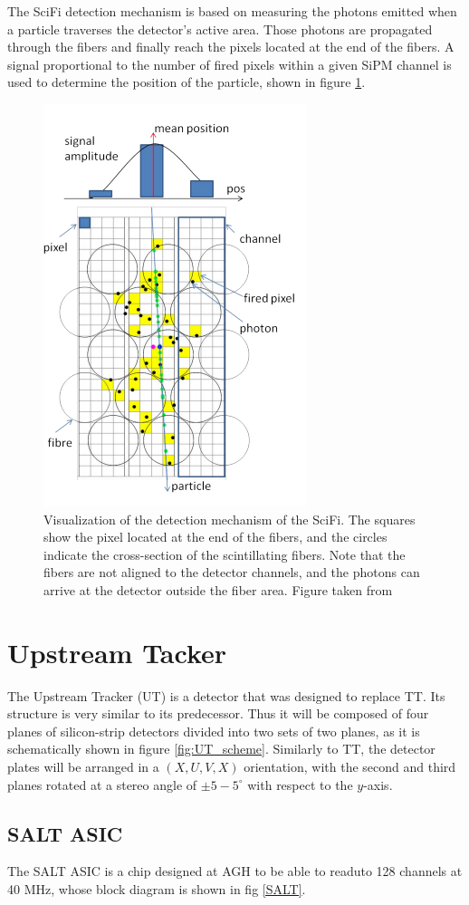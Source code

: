 The SciFi detection mechanism is based on measuring the photons emitted when a particle traverses the detector's active area. Those photons are propagated through the fibers and finally reach the pixels located at the end of the fibers. A signal proportional to the number of fired pixels within a given SiPM channel is used to determine the position of the particle, shown in figure \ref{fig:SciFI_idea}. 


\begin{figure}[!h]
\centering
\includegraphics[scale=0.5]{figures/SciFi_idea.PNG}
\caption{Visualization of the detection mechanism of the SciFi. The squares show the pixel located at the end of the fibers, and the circles indicate the cross-section of the scintillating fibers. Note that the fibers are not aligned to the detector channels, and the photons can arrive at the detector outside the fiber area.  Figure taken from \cite{upgrade_tracker_tdr}
\label{fig:SciFI_idea}}
\end{figure}

 
 \section{Upstream Tacker}
 
 The Upstream Tracker (UT) is a detector that was designed to replace TT. Its structure is very similar to its predecessor. Thus it will be composed of four planes of silicon-strip detectors divided into two sets of two planes, as it is schematically shown in figure \ref{fig:UT_scheme}. Similarly to TT, the detector plates will be arranged in a $(X, U, V, X)$ orientation, with the second and third planes rotated at a stereo angle of $\pm5-5^{\circ}$ with respect to the $y$-axis. 
 
 \subsection{SALT ASIC}
 
 The SALT ASIC is a chip designed at AGH to be able to readuto 128 channels at 40 MHz, whose block diagram is shown in fig \ref{SALT}. 